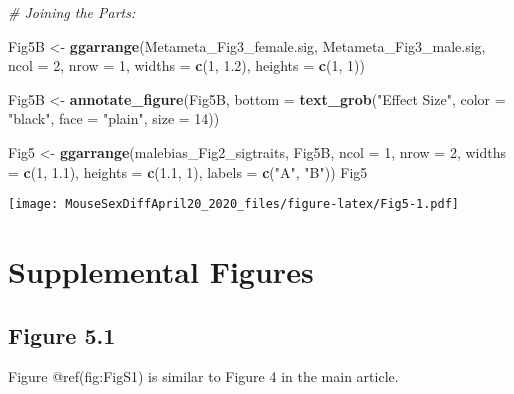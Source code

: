 \documentclass[]{article}
\newenvironment{Shaded}{\begin{snugshade}}{\end{snugshade}}
\newcommand{\CommentTok}[1]{\textcolor[rgb]{0.56,0.35,0.01}{\textit{#1}}}
\newcommand{\DataTypeTok}[1]{\textcolor[rgb]{0.13,0.29,0.53}{#1}}
\newcommand{\DecValTok}[1]{\textcolor[rgb]{0.00,0.00,0.81}{#1}}
\newcommand{\FloatTok}[1]{\textcolor[rgb]{0.00,0.00,0.81}{#1}}
\newcommand{\KeywordTok}[1]{\textcolor[rgb]{0.13,0.29,0.53}{\textbf{#1}}}
\newcommand{\NormalTok}[1]{#1}
\newcommand{\StringTok}[1]{\textcolor[rgb]{0.31,0.60,0.02}{#1}}
\begin{document}
\begin{Shaded}
\begin{Highlighting}[]
\CommentTok{# Joining the Parts:}

\NormalTok{Fig5B <-}\StringTok{ }\KeywordTok{ggarrange}\NormalTok{(Metameta_Fig3_female.sig, Metameta_Fig3_male.sig, }\DataTypeTok{ncol =} \DecValTok{2}\NormalTok{, }\DataTypeTok{nrow =} \DecValTok{1}\NormalTok{, }
    \DataTypeTok{widths =} \KeywordTok{c}\NormalTok{(}\DecValTok{1}\NormalTok{, }\FloatTok{1.2}\NormalTok{), }\DataTypeTok{heights =} \KeywordTok{c}\NormalTok{(}\DecValTok{1}\NormalTok{, }\DecValTok{1}\NormalTok{))}

\NormalTok{Fig5B <-}\StringTok{ }\KeywordTok{annotate_figure}\NormalTok{(Fig5B, }\DataTypeTok{bottom =} \KeywordTok{text_grob}\NormalTok{(}\StringTok{"Effect Size"}\NormalTok{, }\DataTypeTok{color =} \StringTok{"black"}\NormalTok{, }
    \DataTypeTok{face =} \StringTok{"plain"}\NormalTok{, }\DataTypeTok{size =} \DecValTok{14}\NormalTok{))}

\NormalTok{Fig5 <-}\StringTok{ }\KeywordTok{ggarrange}\NormalTok{(malebias_Fig2_sigtraits, Fig5B, }\DataTypeTok{ncol =} \DecValTok{1}\NormalTok{, }\DataTypeTok{nrow =} \DecValTok{2}\NormalTok{, }\DataTypeTok{widths =} \KeywordTok{c}\NormalTok{(}\DecValTok{1}\NormalTok{, }
    \FloatTok{1.1}\NormalTok{), }\DataTypeTok{heights =} \KeywordTok{c}\NormalTok{(}\FloatTok{1.1}\NormalTok{, }\DecValTok{1}\NormalTok{), }\DataTypeTok{labels =} \KeywordTok{c}\NormalTok{(}\StringTok{"A"}\NormalTok{, }\StringTok{"B"}\NormalTok{))}
\NormalTok{Fig5}
\end{Highlighting}
\end{Shaded}

\texttt{[image: MouseSexDiffApril20\_2020\_files/figure-latex/Fig5-1.pdf]}

\hypertarget{supplemental-figures}{%
\section{Supplemental Figures}\label{supplemental-figures}}

\hypertarget{figure-5.1}{%
\subsection{Figure 5.1}\label{figure-5.1}}

Figure @ref(fig:FigS1) is similar to Figure 4 in the main article.
\end{document}
